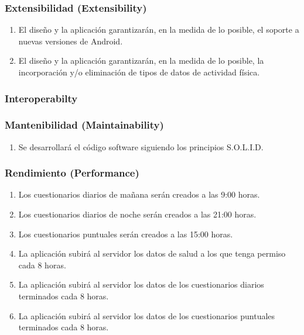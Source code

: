         \subsubsection{Extensibilidad (Extensibility)}
            \begin{enumerate}[resume, label=\textbf{\texttt{RNF-\arabic*}}]
                \item El diseño y la aplicación garantizarán, en la medida de lo posible, el soporte a nuevas versiones de Android.
                \item El diseño y la aplicación garantizarán, en la medida de lo posible, la incorporación y/o eliminación de tipos de datos de actividad física.
            \end{enumerate}
        \subsubsection{Interoperabilty}
        \subsubsection{Mantenibilidad (Maintainability)}
            \begin{enumerate}[resume, label=\textbf{\texttt{RNF-\arabic*}}]
                \item Se desarrollará el código software siguiendo los principios S.O.L.I.D.
            \end{enumerate}
        \subsubsection{Rendimiento (Performance)}
            \begin{enumerate}[resume, label=\textbf{\texttt{RNF-\arabic*}}]
                \item Los cuestionarios diarios de mañana serán creados a las 9:00 horas.
                \item Los cuestionarios diarios de noche serán creados a las 21:00 horas.
                \item Los cuestionarios puntuales serán creados a las 15:00 horas.
                \item La aplicación subirá al servidor los datos de salud a los que tenga permiso cada 8 horas.
                \item La aplicación subirá al servidor los datos de los cuestionarios diarios terminados cada 8 horas.
                \item La aplicación subirá al servidor los datos de los cuestionarios puntuales terminados cada 8 horas.
    
            \end{enumerate}
